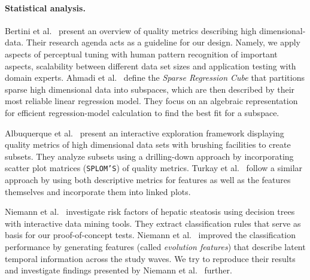 \documentclass[journal]{style/vgtc} 			          %
\begin{document}
\paragraph{Statistical analysis.}
Bertini et al.~\cite{Bertini} present an overview of quality metrics describing high dimensional-data.
Their research agenda acts as a guideline for our design.
Namely, we apply aspects of perceptual tuning with human pattern recognition of important aspects, scalability between different data set sizes and application testing with domain experts.
Ahmadi et al.~\cite{Ahmadi} define the \emph{Sparse Regression Cube} that partitions sparse high dimensional data into subspaces, which are then described by their most reliable linear regression model.
They focus on an algebraic representation for efficient regression-model calculation to find the best fit for a subspace.

Albuquerque et al.~\cite{Albuquerque} present an interactive exploration framework displaying quality metrics of high dimensional data sets with brushing facilities to create subsets.
They analyze subsets using a drilling-down approach by incorporating scatter plot matrices (\texttt{SPLOM'S}) of quality metrics. %
Turkay et al.~\cite{Turkay} follow a similar approach by using both descriptive metrics for features as well as the features themselves and incorporate them into linked plots.

Niemann et al.~\cite{Niemann2014} investigate risk factors of hepatic steatosis using decision trees with interactive data mining tools.
They extract classification rules that serve as basis for our proof-of-concept tests.
Niemann et al.~\cite{Niemann2015} improved the classification performance by generating features (called \emph{evolution features}) that describe latent temporal information across the study waves.
We try to reproduce their results and investigate findings presented by Niemann et al.~\cite{Niemann2014} further.
\end{document}
